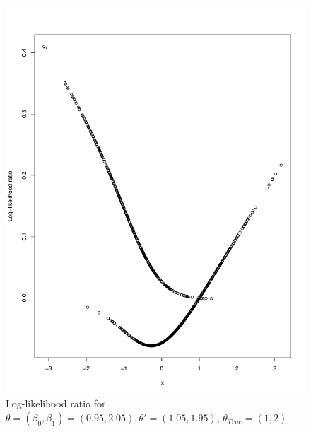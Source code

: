 \begin{figure}
    \centering
    \includegraphics[scale = 0.7]{figures/loglik_ratio_logistic.pdf}
    \caption{Log-likelihood ratio for $\theta = \left(\beta_0, \beta_1\right) = \left(0.95, 2.05\right), \theta' = \left(1.05, 1.95\right)$, $\theta_{True} = \left(1, 2\right)$}
    \label{fig:loglik_ratio_logistic}
\end{figure}{}
